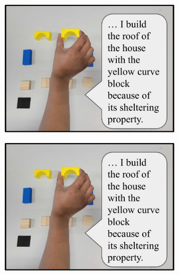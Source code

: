 \begin{figure}[h]
  \centering
\begin{subfigure}{0.28\textwidth}
\includegraphics[width=\textwidth,page=1]{figures/figure1_breakdown.pdf}
  \subcaption{}
\end{subfigure}
\hspace{0.01\textwidth}
\begin{subfigure}{0.28\textwidth}
\includegraphics[width=\textwidth,page=2]{figures/figure1_breakdown.pdf}
  \subcaption{}
\end{subfigure}
\hspace{0.01\textwidth}
%
\begin{subfigure}{0.28\textwidth}

\end{subfigure}
\end{figure}
